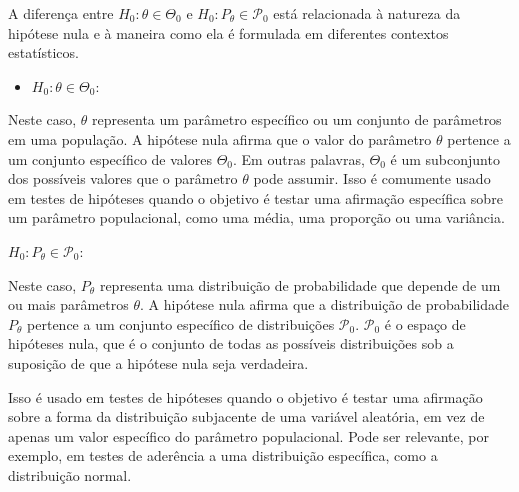 \documentclass[12pt]{beamer}
\begin{document}
\begin{frame}{}
\begin{block}{}
\justifying
A diferença entre $H_{0}: \theta \in \Theta_{0}$ e $H_{0}: P_{\theta} \in \mathcal{P}_{0}$ está relacionada à natureza da hipótese nula e à maneira como ela é formulada em diferentes contextos estatísticos.
\end{block}
\pause
\begin{block}{}
\justifying
\begin{itemize}
    \item $H_{0}: \theta \in \Theta_{0}$:
\end{itemize}
\end{block}
\pause
\begin{block}{}
\justifying
Neste caso, $\theta$ representa um parâmetro específico ou um conjunto de parâmetros em uma população. A hipótese nula afirma que o valor do parâmetro $\theta$ pertence a um conjunto específico de valores $\Theta_{0}$. Em outras palavras, $\Theta_{0}$ é um subconjunto dos possíveis valores que o parâmetro $\theta$ pode assumir. Isso é comumente usado em testes de hipóteses quando o objetivo é testar uma afirmação específica sobre um parâmetro populacional, como uma média, uma proporção ou uma variância.
\end{block}
\end{frame}

\begin{frame}{}
\begin{block}{}
\justifying
$H_{0}: P_{\theta} \in \mathcal{P}_{0}$:
\end{block}
\pause
\begin{block}{}
\justifying
Neste caso, $P_{\theta}$ representa uma distribuição de probabilidade que depende de um ou mais parâmetros $\theta$. A hipótese nula afirma que a distribuição de probabilidade $P_{\theta}$ pertence a um conjunto específico de distribuições $\mathcal{P}_{0}$. $\mathcal{P}_{0}$ é o espaço de hipóteses nula, que é o conjunto de todas as possíveis distribuições sob a suposição de que a hipótese nula seja verdadeira.
\end{block}
\pause
\begin{block}{}
\justifying
Isso é usado em testes de hipóteses quando o objetivo é testar uma afirmação sobre a forma da distribuição subjacente de uma variável aleatória, em vez de apenas um valor específico do parâmetro populacional. Pode ser relevante, por exemplo, em testes de aderência a uma distribuição específica, como a distribuição normal.
\end{block}
\end{frame}
\end{document}
